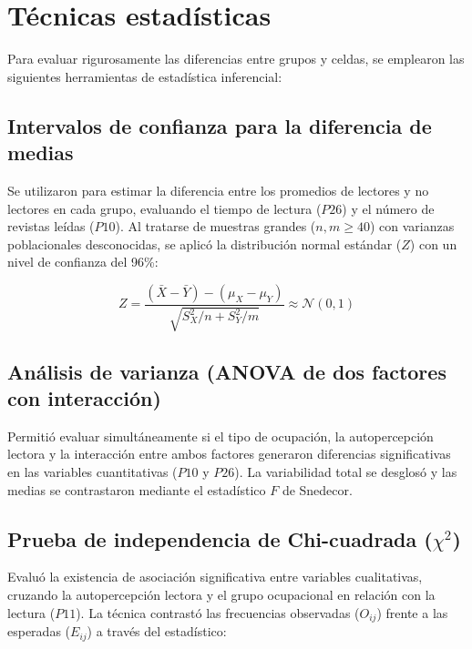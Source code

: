 \documentclass[
  spanish,
  11pt,
]{extarticle}
\begin{document}
\section{Técnicas estadísticas}\label{tuxe9cnicas-estaduxedsticas}

Para evaluar rigurosamente las diferencias entre grupos y celdas, se
emplearon las siguientes herramientas de estadística inferencial:

\subsection{Intervalos de confianza para la diferencia de
medias}\label{intervalos-de-confianza-para-la-diferencia-de-medias}

Se utilizaron para estimar la diferencia entre los promedios de lectores
y no lectores en cada grupo, evaluando el tiempo de lectura (\(P26\)) y
el número de revistas leídas (\(P10\)). Al tratarse de muestras grandes
(\(n, m \ge 40\)) con varianzas poblacionales desconocidas, se aplicó la
distribución normal estándar (\(Z\)) con un nivel de confianza del 96\%:

\[Z = \frac{(\bar{X} - \bar{Y}) - (\mu_X - \mu_Y)}{\sqrt{S_X^2/n + S_Y^2/m}} \approx \mathcal{N}(0, 1)\]

\subsection{Análisis de varianza (ANOVA de dos factores con
interacción)}\label{anuxe1lisis-de-varianza-anova-de-dos-factores-con-interacciuxf3n}

Permitió evaluar simultáneamente si el tipo de ocupación, la
autopercepción lectora y la interacción entre ambos factores generaron
diferencias significativas en las variables cuantitativas (\(P10\) y
\(P26\)). La variabilidad total se desglosó y las medias se contrastaron
mediante el estadístico \(F\) de Snedecor.

\subsection{\texorpdfstring{Prueba de independencia de Chi-cuadrada
(\(\chi^2\))}{Prueba de independencia de Chi-cuadrada (\textbackslash chi\^{}2)}}\label{prueba-de-independencia-de-chi-cuadrada-chi2}

Evaluó la existencia de asociación significativa entre variables
cualitativas, cruzando la autopercepción lectora y el grupo ocupacional
en relación con la lectura (\(P11\)). La técnica contrastó las
frecuencias observadas (\(O_{ij}\)) frente a las esperadas (\(E_{ij}\))
a través del estadístico:
\end{document}

